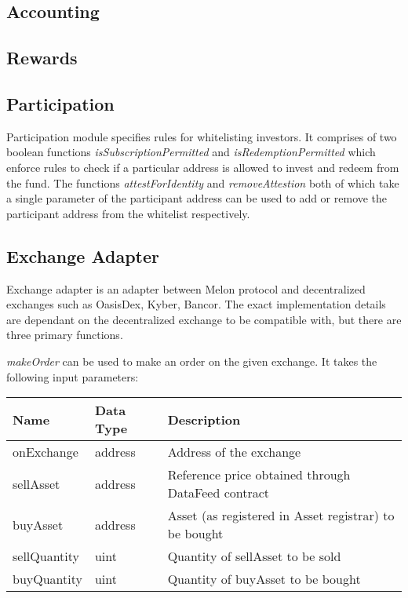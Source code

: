\documentclass[conference]{IEEEtran}
\begin{document}
\subsection{Accounting} \label{accounting}

\subsection{Rewards}

\subsection{Participation}

Participation module specifies rules for whitelisting investors. It comprises of two boolean functions \textit{isSubscriptionPermitted} and \textit{isRedemptionPermitted} which enforce rules to check if a particular address is allowed to invest and redeem from the fund. The functions \textit{attestForIdentity} and \textit{removeAttestion} both of which take a single parameter of the participant address can be used to add or remove  the participant address from the whitelist respectively. 

\subsection{Exchange Adapter}

Exchange adapter is an adapter between Melon protocol and decentralized exchanges such as OasisDex, Kyber, Bancor. The exact implementation details are dependant on the decentralized exchange to be compatible with, but there are three primary functions.

\textit{makeOrder} can be used to make an order on the given exchange. It takes the following input parameters:
\begin{center}
	\footnotesize
	\begin{tabular}{ | p{2.7cm} | p{0.8cm} | p{4cm} | }
		\hline
		Name & Data Type & Description \\ \hline
		onExchange & address & Address of the exchange \\ \hline
		sellAsset & address &  Reference price obtained through DataFeed contract \\ \hline
		buyAsset & address & Asset (as registered in Asset registrar) to be bought \\ \hline
		sellQuantity & uint & Quantity of sellAsset to be sold \\ \hline
		buyQuantity & uint & Quantity of buyAsset to be bought \\ \hline
	\end{tabular}
\end{center}
\end{document}
